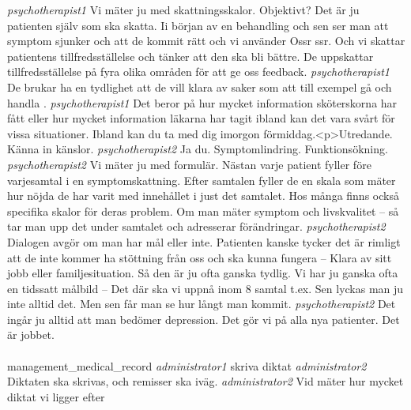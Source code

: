 \documentclass[12pt,a4paper,oneside]{article}
\begin{document}
 {\it psychotherapist1 %
} 
Vi mäter ju med skattningsskalor. Objektivt? Det är ju patienten själv som ska skatta. Ii början av en behandling och sen ser man att symptom sjunker och att de kommit rätt och vi använder Ossr ssr. Och vi skattar patientens tillfredsställelse och tänker att den ska bli bättre. De uppskattar tillfredsställelse på fyra olika områden för att ge oss feedback. %
 {\it psychotherapist1 %
} 
De brukar ha en tydlighet att de vill klara av saker som att till exempel gå och handla . %
 {\it psychotherapist1 %
} 
Det beror på hur mycket information sköterskorna har fått eller hur mycket information läkarna har tagit ibland kan det vara svårt för vissa situationer. Ibland kan du ta med dig imorgon förmiddag.<p>Utredande. Känna in känslor. %
 {\it psychotherapist2 %
} 
Ja du. Symptomlindring. Funktionsökning.  %
 {\it psychotherapist2 %
} 
Vi mäter ju med formulär. Nästan varje patient fyller före varjesamtal i en symptomskattning. Efter samtalen fyller de en skala som mäter hur nöjda de har varit med innehållet i just det samtalet. Hos många finns också specifika skalor för deras problem. Om man mäter symptom och livskvalitet -- så tar man upp det under samtalet och adresserar förändringar. %
 {\it psychotherapist2 %
} 
Dialogen avgör om man har mål eller inte. Patienten kanske tycker det är rimligt att de inte kommer ha stöttning från oss och ska kunna fungera -- Klara av sitt jobb eller familjesituation. Så den är ju ofta ganska tydlig. Vi har ju ganska ofta en tidssatt målbild -- Det där ska vi uppnå inom 8 samtal t.ex. Sen lyckas man ju inte alltid det. Men sen får man se hur långt man kommit. %
 {\it psychotherapist2 %
} 
Det ingår ju alltid att man bedömer depression. Det gör vi på alla nya patienter. Det är jobbet.  %
\\
\\
management\_medical\_record %
 {\it  administrator1 %
} 
 skriva diktat %
 {\it administrator2 %
} 
Diktaten ska skrivas, och remisser ska iväg. %
 {\it administrator2 %
} 
Vid mäter hur mycket diktat vi ligger efter %
\end{document}

